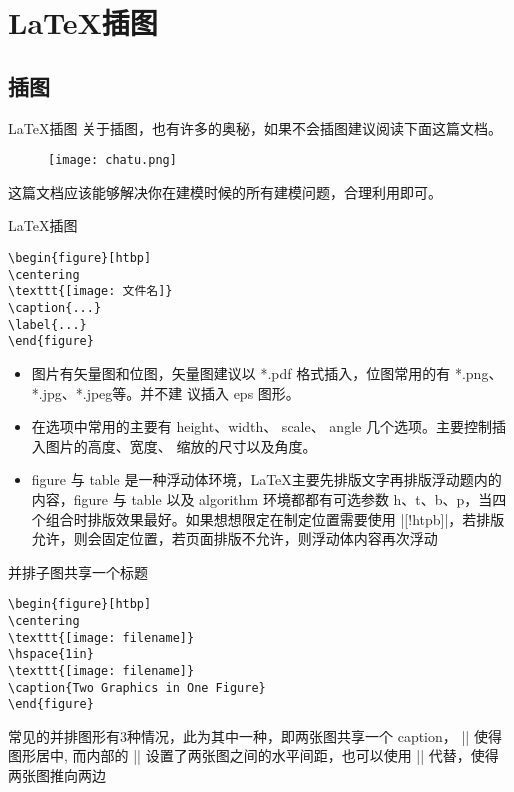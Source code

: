 \section{\LaTeX 插图}
\subsection{插图}

\begin{frame}[fragile]{\LaTeX 插图}
关于插图，也有许多的奥秘，如果不会插图建议阅读下面这篇文档。
\begin{figure}[htbp]
\centering
\texttt{[image: chatu.png]}
\end{figure}
这篇文档应该能够解决你在建模时候的所有建模问题，合理利用即可。
\end{frame}
 

 \begin{frame}[fragile]{\LaTeX 插图}
\begin{lstlisting}
\begin{figure}[htbp]
\centering
\texttt{[image: 文件名]}
\caption{...}
\label{...}
\end{figure}
\end{lstlisting}
\begin{itemize}
	\item 图片有矢量图和位图，矢量图建议以 *.pdf 格式插入，位图常用的有 *.png、*.jpg、*.jpeg等。并不建
	议插入 eps 图形。
	\item 在选项中常用的主要有 height、width、 scale、 angle 几个选项。主要控制插入图片的高度、宽度、
	缩放的尺寸以及角度。
	\item figure 与 table 是一种浮动体环境，\LaTeX 主要先排版文字再排版浮动题内的内容，figure 与 table 以及 
	algorithm 环境都都有可选参数 h、t、b、p，当四个组合时排版效果最好。如果想想限定在制定位置需要使用
	|[!htpb]|，若排版允许，则会固定位置，若页面排版不允许，则浮动体内容再次浮动
\end{itemize}

\end{frame}

\begin{frame}[fragile]{并排子图共享一个标题}
\begin{lstlisting}
\begin{figure}[htbp]
\centering
\texttt{[image: filename]}
\hspace{1in}
\texttt{[image: filename]} 
\caption{Two Graphics in One Figure}
\end{figure} \end{lstlisting}	
常见的并排图形有3种情况，此为其中一种，即两张图共享一个 caption， |\centering| 使得图形居中, 而内部的 
|\hspace{length}| 设置了两张图之间的水平间距，也可以使用 |\hfil| 代替，使得两张图推向两边
\end{frame}


